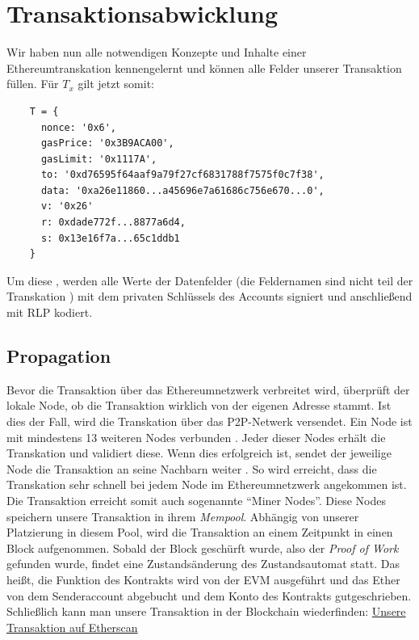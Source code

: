 \documentclass[runningheads]{llncs}
\begin{document}
\section{Transaktionsabwicklung}
Wir haben nun alle notwendigen Konzepte und Inhalte einer Ethereumtranskation kennengelernt und können alle Felder unserer Transaktion füllen. Für $T_x$ gilt jetzt somit:
\begin{center}
  \begin{verbatim}
    T = { 
      nonce: '0x6',
      gasPrice: '0x3B9ACA00',
      gasLimit: '0x1117A',
      to: '0xd76595f64aaf9a79f27cf6831788f7575f0c7f38',
      data: '0xa26e11860...a45696e7a61686c756e670...0',
      v: '0x26'
      r: 0xdade772f...8877a6d4,
      s: 0x13e16f7a...65c1ddb1
    }
  \end{verbatim}
\end{center}

Um diese , werden alle Werte der Datenfelder (die Feldernamen sind nicht teil der Transkation \cite[S. 100]{antonopoulos_mastering_2019}) mit dem privaten Schlüssels des Accounts signiert und anschließend mit RLP kodiert.

\subsection{Propagation}
Bevor die Transaktion über das Ethereumnetzwerk verbreitet wird, überprüft der lokale Node, ob die Transaktion wirklich von der eigenen Adresse stammt. Ist dies der Fall, wird die Transkation über das P2P-Netwerk versendet. Ein Node ist mit mindestens 13 weiteren Nodes verbunden \cite[S. 123]{antonopoulos_mastering_2019}. Jeder dieser Nodes erhält die Transkation und validiert diese. Wenn dies erfolgreich ist, sendet der jeweilige Node die Transaktion an seine Nachbarn weiter \cite[S. 123]{antonopoulos_mastering_2019}. So wird erreicht, dass die Transkation sehr schnell bei jedem Node im Ethereumnetzwerk angekommen ist. Die Transaktion erreicht somit auch sogenannte "`Miner Nodes"'. Diese Nodes speichern unsere Transaktion in ihrem \textit{Mempool}. Abhängig von unserer Platzierung in diesem Pool, wird die Transaktion an einem Zeitpunkt in einen Block aufgenommen. Sobald der Block geschürft wurde, also der \textit{Proof of Work} gefunden wurde, findet eine Zustandsänderung des Zustandsautomat statt. Das heißt, die Funktion des Kontrakts wird von der EVM ausgeführt und das Ether von dem Senderaccount abgebucht und dem Konto des Kontrakts gutgeschrieben. Schließlich kann man unsere Transaktion in der Blockchain wiederfinden: \href{https://ropsten.etherscan.io/tx/0x6c5cd70f3464a6b68f95ba1bb7ebb5ece5a2f1ab4d45a5bb068e727e08fa827d}{Unsere Transaktion auf Etherscan}
\end{document}
